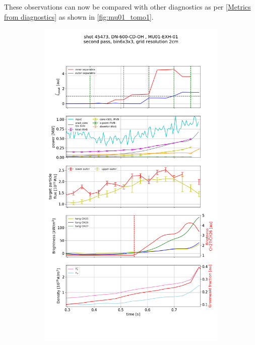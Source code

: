 These observations can now be compared with other diagnostics as per \autoref{Metrics from diagnostics} as shown in \autoref{fig:mu01_tomo1}.
\begin{figure}
     \centering
     \begin{subfigure}{0.8\linewidth}
         \centering
         \includegraphics[trim={0 960 0 150},clip,width=\textwidth]{Chapters/chapter2/figs/IRVB-MASTU_shot-45473_pass1_bin6x3x3_gridres2cm_all_variables_absolute_small3.png}

\end{subfigure}
\end{figure}
